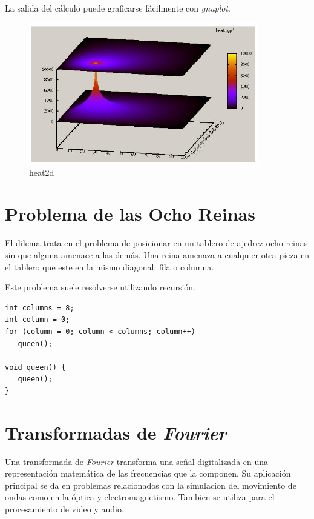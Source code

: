 \documentclass[a4paper]{report}
\begin{document}
La salida del c\'alculo puede graficarse f\'acilmente con {\it gnuplot}.

\begin{figure}[H]
\begin{center}
\includegraphics[width=10cm]{heat2d.png}
\caption{heat2d}
\end{center}
\end{figure}

\section{Problema de las Ocho Reinas}

El dilema trata en el problema de posicionar en un tablero de ajedrez ocho
reinas sin que alguna amenace a las dem\'as. Una reina amenaza a cualquier otra
pieza en el tablero que este en la mismo diagonal, fila o columna.

\bigskip

Este problema suele resolverse utilizando recursi\'on.

\begin{verbatim}
int columns = 8;
int column = 0;
for (column = 0; column < columns; column++)
   queen();

void queen() {
   queen();
}
\end{verbatim}

\section{Transformadas de {\it Fourier}}

Una transformada de {\it Fourier} \cite{fourier} transforma una se\~nal
digitalizada en una representaci\'on matem\'atica de las frecuencias que la
componen. Su aplicaci\'on principal se da en problemas relacionados con la simulacion del
movimiento de ondas como en la \'optica y electromagnetismo. Tambien se utiliza para el procesamiento de video y audio.
\end{document}
